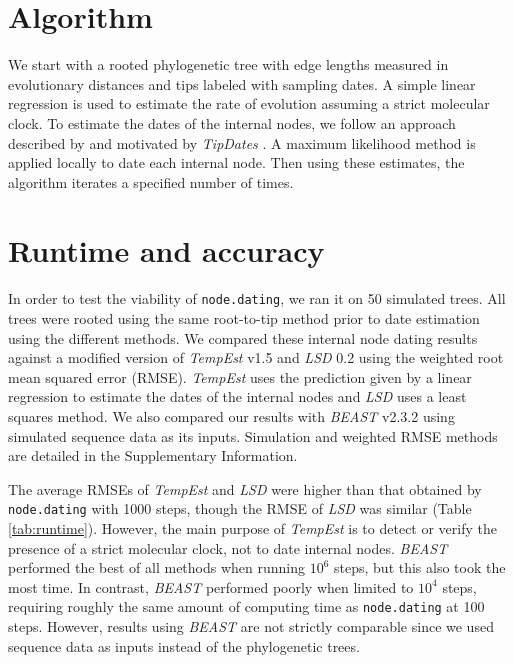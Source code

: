 \documentclass{bioinfo}
\newcommand{\code}[1]{{\tt #1}}
\begin{document}
\vspace*{-15pt}

\section{Algorithm} \label{sec:alg}
We start with a rooted phylogenetic tree with edge lengths measured in evolutionary distances and tips labeled with sampling dates.
A simple linear regression is used to estimate the rate of evolution assuming a strict molecular clock.
To estimate the dates of the internal nodes, we follow an approach described by \cite{Felsenstein81} and motivated by \emph{TipDates} \citep{TipDates}.
A maximum likelihood method is applied locally to date each internal node.
Then using these estimates, the algorithm iterates a specified number of times.

\vspace*{-15pt}

\section{Runtime and accuracy} \label{sec:tests}
In order to test the viability of \code{node.dating}, we ran it on 50 simulated trees.
All trees were rooted using the same root-to-tip method prior to date estimation using the different methods.
We compared these internal node dating results against a modified version of \emph{TempEst} v1.5 and \emph{LSD} 0.2 using the weighted root mean squared error (RMSE).
\emph{TempEst} uses the prediction given by a linear regression to estimate the dates of the internal nodes and \emph{LSD} uses a least squares method.
We also compared our results with \emph{BEAST} v2.3.2 using simulated sequence data as its inputs.
Simulation and weighted RMSE methods are detailed in the Supplementary Information.

The average RMSEs of \emph{TempEst} and \emph{LSD} were higher than that obtained by \code{node.dating} with 1000 steps, though the RMSE of \emph{LSD} was similar (Table \ref{tab:runtime}).
However, the main purpose of \emph{TempEst} is to detect or verify the presence of a strict molecular clock, not to date internal nodes.
\emph{BEAST} performed the best of all methods when running $10^6$ steps, but this also took the most time.
In contrast, \emph{BEAST} performed poorly when limited to $10^4$ steps, requiring roughly the same amount of computing time as \code{node.dating} at 100 steps.
However, results using \emph{BEAST} are not strictly comparable since we used sequence data as inputs instead of the phylogenetic trees.
\end{document}
